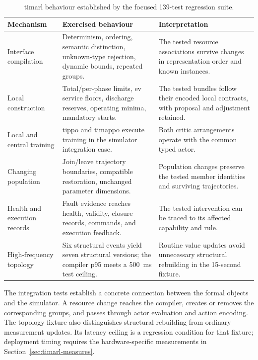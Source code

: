\begin{table}[htbp]
\centering
\small
\caption{\gls{timarl} behaviour established by the focused 139-test regression suite.}
\label{tab:timarl-verified-evidence}
\begin{tabularx}{\textwidth}{@{}p{}p{}X@{}}
\toprule
\textbf{Mechanism} & \textbf{Exercised behaviour} & \textbf{Interpretation}\\
\midrule
Interface compilation & Determinism, ordering, semantic distinction, unknown-type rejection, dynamic bounds, repeated groups. & The tested resource associations survive changes in representation order and known instances.\\
\addlinespace
Local construction & Total/per-phase limits, \gls{ev} service floors, discharge reserves, operating minima, mandatory starts. & The tested bundles follow their encoded local contracts, with proposal and adjustment retained.\\
\addlinespace
Local and central training & \gls{tippo} and \gls{timappo} execute training in the simulator integration case. & Both critic arrangements operate with the common typed actor.\\
\addlinespace
Changing population & Join/leave trajectory boundaries, compatible restoration, unchanged parameter dimensions. & Population changes preserve the tested member identities and surviving trajectories.\\
\addlinespace
Health and execution records & Fault evidence reaches health, validity, closure records, commands, and execution feedback. & The tested intervention can be traced to its affected capability and rule.\\
\addlinespace
High-frequency topology & Six structural events yield seven structural versions; the compiler p95 meets a 500~ms test ceiling. & Routine value updates avoid unnecessary structural rebuilding in the 15-second fixture.\\
\bottomrule
\end{tabularx}
\end{table}

The integration tests establish a concrete connection between the formal objects and the simulator. A resource change reaches the compiler, creates or removes the corresponding groups, and passes through actor evaluation and action encoding. The topology fixture also distinguishes structural rebuilding from ordinary measurement updates. Its latency ceiling is a regression condition for that fixture; deployment timing requires the hardware-specific measurements in Section~\ref{sec:timarl-measures}.

